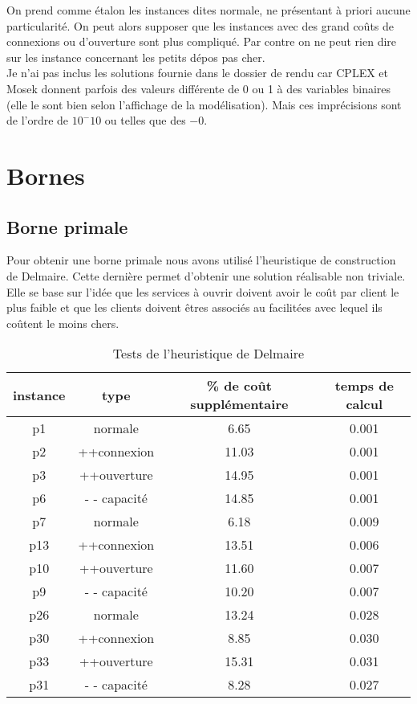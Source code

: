 \documentclass[12pt,a4paper]{article}
\begin{document}
On prend comme étalon les instances dites normale, ne présentant à priori aucune particularité. On peut alors supposer que les instances avec des grand coûts de connexions ou d'ouverture sont plus compliqué. Par contre on ne peut rien dire sur les instance concernant les petits dépos pas cher.\\

Je n'ai pas inclus les solutions fournie dans le dossier de rendu car CPLEX et Mosek donnent parfois des valeurs différente de 0 ou 1 à des variables binaires (elle le sont bien selon l'affichage de la modélisation). Mais ces imprécisions sont de l'ordre de $10^-10$ ou telles que des $-0$.

\section{Bornes}

\subsection{Borne primale}

Pour obtenir une borne primale nous avons utilisé l'heuristique de construction de Delmaire. Cette dernière permet d'obtenir une solution réalisable non triviale. Elle se base sur l’idée que les services à ouvrir doivent avoir le coût par client le plus faible et que les clients doivent êtres associés au facilitées avec lequel ils coûtent le moins chers.\\

\begin{table}[!h]
\centering
\begin{tabular}{|c|c|c|c|}
  \hline
  instance & type & \% de coût supplémentaire & temps de calcul \\
  \hline
	p1 & normale & 6.65 & 0.001 \\
	p2 & ++connexion & 11.03 & 0.001 \\
	p3 & ++ouverture & 14.95 & 0.001 \\
	p6 & - - capacité & 14.85 & 0.001 \\
  \hline
	p7 & normale & 6.18 & 0.009 \\
	p13 & ++connexion & 13.51 & 0.006 \\
	p10 & ++ouverture & 11.60 & 0.007 \\
	p9 & - - capacité & 10.20 & 0.007 \\
  \hline	
	p26 & normale & 13.24 & 0.028 \\
	p30 & ++connexion & 8.85 & 0.030 \\
	p33 & ++ouverture & 15.31 & 0.031 \\
	p31 & - - capacité & 8.28 & 0.027 \\
  \hline
\end{tabular}
\caption{Tests de l'heuristique de Delmaire}
\label{delmaire}
\end{table}
\end{document}
